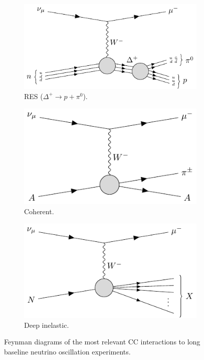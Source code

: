 \begin{figure}[t]
	\begin{subfigure}{0.5\textwidth}
		\centering
		\includegraphics[width=.90\linewidth]{Images//Nu/feynman_ccres_delta+.pdf}
		\caption{RES ($\Delta^{+} \rightarrow p + \pi^{0}$).}
	\end{subfigure}
	\begin{subfigure}{0.5\textwidth}
		\centering
		\includegraphics[width=.90\linewidth]{Images//Nu/feynman_cccoh.pdf}
		\caption{Coherent.}
	\end{subfigure}
	\begin{subfigure}{0.5\textwidth}
		\centering
		\includegraphics[width=.90\linewidth]{Images//Nu/feynman_ccdis.pdf}
		\caption{Deep inelastic.}
	\end{subfigure}
	\caption{Feynman diagrams of the most relevant CC interactions to long baseline neutrino oscillation experiments.}
	\label{fig:neutrino_cc_interactions}
\end{figure}

